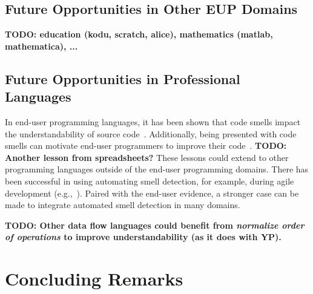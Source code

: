 \documentclass[10pt,conference,compsocconf]{IEEEtran}
\newcommand{\todo}[1]{\textbf{TODO: #1}}
\begin{document}
\subsection{Future Opportunities in Other EUP Domains}
\todo{education (kodu, scratch, alice), mathematics (matlab, mathematica), ...}

\subsection{Future Opportunities in Professional Languages}
In end-user programming languages, it has been shown that code smells impact the understandability of
source code~\cite{StoleeTSE2013}. Additionally, being presented with code smells can motivate end-user programmers to improve their code~\cite{chambers2013smell}. 
\todo{Another lesson from spreadsheets?}
These lessons could extend to other programming languages outside of the end-user programming domains. There has been successful in using automating smell detection, for example, during agile development (e.g.,~\cite{Schumacher:2010:BES:1852786.1852797}). Paired with the end-user evidence, a stronger case can be made to integrate automated smell detection in many domains. 

\todo{Other data flow languages could benefit from \emph{normalize order of operations} to improve understandability (as it does with YP). }

\section{Concluding Remarks}
\label{sec:conclusions}

\newpage
\balance





\end{document}
